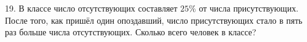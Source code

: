19. В классе число отсутствующих составляет $25\%$ от числа присутствующих. После того, как пришёл один опоздавший, число присутствующих стало в пять раз больше числа отсутствующих. Сколько всего человек в классе?\\
